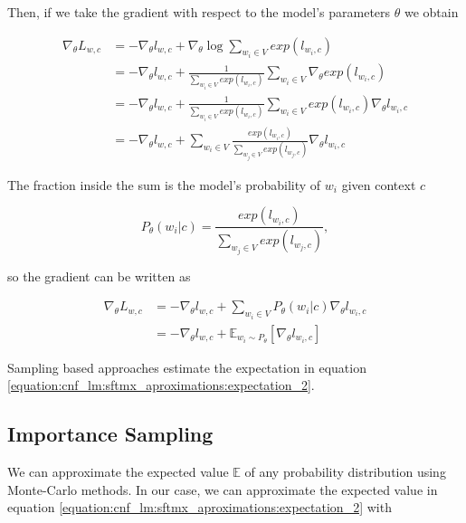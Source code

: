 Then, if we take the gradient with respect to the model's parameters $ \theta $ we obtain

\begin{align}
    \nabla_\theta L_{w, c} &= - \nabla_\theta l_{w, c} + \nabla_\theta \log \sum_{w_i \in V} exp(l_{w_i,c}) \\
                           &= - \nabla_\theta l_{w, c} + \frac{1}{\sum_{w_i \in V} exp(l_{w_i,c})} \sum_{w_i \in V} \nabla_\theta exp(l_{w_i,c}) \\
                           &= - \nabla_\theta l_{w, c} + \frac{1}{\sum_{w_i \in V} exp(l_{w_i,c})} \sum_{w_i \in V} exp(l_{w_i,c}) \nabla_\theta l_{w_i, c} \\
                           &= - \nabla_\theta l_{w, c} + \sum_{w_i \in V} \frac{exp(l_{w_i,c})}{\sum_{w_j \in V} exp(l_{w_j,c})} \nabla_\theta l_{w_i, c}
\end{align}

The fraction inside the sum is the model's probability of $ w_i $ given context $ c $

\begin{displaymath}
    P_\theta(w_i | c) = \frac{exp(l_{w_i,c})}{\sum_{w_j \in V} exp(l_{w_j,c})},
\end{displaymath}

so the gradient can be written as

\begin{align}
    \label{equation:cnf_lm:sftmx_aproximations:expectation_1}
    \nabla_\theta L_{w, c} &= - \nabla_\theta l_{w, c} + \sum_{w_i \in V}  P_\theta(w_i | c) \nabla_\theta l_{w_i, c} \\
                           \label{equation:cnf_lm:sftmx_aproximations:expectation_2}
                           &= - \nabla_\theta l_{w, c} + \mathbb{E}_{w_i \sim P_\theta} [ \nabla_\theta l_{w_i, c} ]
\end{align}

Sampling based approaches estimate the expectation in equation \ref{equation:cnf_lm:sftmx_aproximations:expectation_2}.

\subsection{Importance Sampling}
We can approximate the expected value $ \mathbb{E} $ of any probability distribution using Monte-Carlo methods. In our case, we can approximate the expected value in equation \ref{equation:cnf_lm:sftmx_aproximations:expectation_2} with

